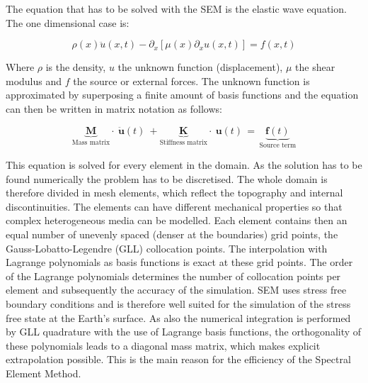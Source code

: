 
The equation that has to be solved with the SEM is the elastic wave equation. The one dimensional case is: 

\begin{equation}\label{1Dwave}
\rho(x) \ddot{u}(x,t) -  \partial_x \left[ \mu(x) \partial_x u(x,t) \right] = f(x,t)
\end{equation}

Where $\rho$ is the density, $u$ the unknown function (displacement), $\mu$ the shear modulus and $f$ the source or external forces.
%
The unknown function is approximated by superposing a finite amount of basis functions and the equation can then be written in matrix 
notation as follows: 

\begin{equation}\label{matrix_equation}
\underbrace{\textbf{M}}_{\text{Mass matrix}} \cdot \ \ddot{\textbf {u}} (t)  \ + \underbrace{\textbf{K}}_{\text{Stiffness matrix}} \cdot \ \textbf{u} (t) \, = \, \underbrace{\textbf{f} (t)}_{\text{Source term}} 
\end{equation}

%

This equation is solved for every element in the domain. 
As the solution has to be found numerically the problem has to be discretised. 
The whole domain is therefore divided in mesh elements, which reflect the topography and internal discontinuities.
The elements can have different mechanical properties so that complex heterogeneous media can be modelled. 
Each element contains then an equal number of unevenly spaced (denser at the boundaries) grid points, the 
Gauss-Lobatto-Legendre (GLL) collocation points.
The interpolation with Lagrange polynomials as basis functions is exact at these grid points. 
The order of the Lagrange polynomials determines the number of collocation points per element and subsequently the accuracy of the simulation. 
%
SEM uses stress free boundary conditions and is therefore well suited for the simulation of the stress free state at the Earth's surface. 
%
As also the numerical integration is performed by GLL quadrature with the use of Lagrange basis functions, 
the orthogonality of these polynomials leads to a diagonal mass matrix, which makes explicit extrapolation possible. 
This is the main reason for the efficiency of the Spectral Element Method.

